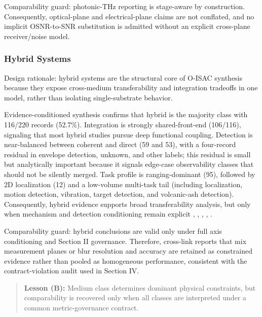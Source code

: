 Comparability guard: photonic-THz reporting is stage-aware by construction. Consequently, optical-plane and electrical-plane claims are not conflated, and no implicit OSNR-to-SNR substitution is admitted without an explicit cross-plane receiver/noise model.

\subsubsection{Hybrid Systems}
Design rationale: hybrid systems are the structural core of O-ISAC synthesis because they expose cross-medium transferability and integration tradeoffs in one model, rather than isolating single-substrate behavior.

Evidence-conditioned synthesis confirms that hybrid is the majority class with 116/220 records (52.7\%). Integration is strongly shared-front-end (106/116), signaling that most hybrid studies pursue deep functional coupling. Detection is near-balanced between coherent and direct (59 and 53), with a four-record residual in envelope detection, unknown, and other labels; this residual is small but analytically important because it signals edge-case observability classes that should not be silently merged. Task profile is ranging-dominant (95), followed by 2D localization (12) and a low-volume multi-task tail (including localization, motion detection, vibration, target detection, and volcanic-ash detection). Consequently, hybrid evidence supports broad transferability analysis, but only when mechanism and detection conditioning remain explicit \cite{O_ISAC_021}, \cite{O_ISAC_077}, \cite{O_ISAC_041}, \cite{O_ISAC_199}, \cite{O_ISAC_010}.

Comparability guard: hybrid conclusions are valid only under full axis conditioning and Section II governance. Therefore, cross-link reports that mix measurement planes or blur resolution and accuracy are retained as constrained evidence rather than pooled as homogeneous performance, consistent with the contract-violation audit used in Section IV.

\begin{quote}
\textbf{Lesson (B):} Medium class determines dominant physical constraints, but comparability is recovered only when all classes are interpreted under a common metric-governance contract.
\end{quote}

